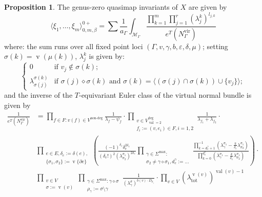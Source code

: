 \documentclass[11pt]{amsart}
\newcommand{\val}{\operatorname{val}}
\newcommand{\vv}{\operatorname{v}}
\theoremstyle{definition}
\newtheorem{prop}[thm]{Proposition}
\theoremstyle{definition}
\begin{document}
\begin{prop}

The genus-zero quasimap invariants of $X$ are given by
\begin{equation}
 \langle \xi_1,\ldots,\xi_m\rangle^{0+}_{0,m,\beta}=\sum \frac{1}{a_\Gamma}\int_{\mathcal M_\Gamma}\frac{\prod_{k=1}^m\prod_{j=1}^r(\lambda^k_j)^{l_{j,k}}}{e^T(N_\Gamma^\text{vir})}
\end{equation}
where: the sum runs over all fixed point loci $\left(\Gamma, v, \gamma, b,\varepsilon,\delta,\mu\right)$; setting $\sigma(k)=\vv(\mu(k))$, $\lambda^k_j$ is given by: 
\begin{equation*}
 \begin{cases}
  0 & \text{if } v_j\notin \sigma(k); \\
  \lambda^{\sigma(k)}_{\sigma(j)} & \text{if } \sigma(j)\diamond\sigma(k) \text{ and } \sigma(k)=\langle(\sigma(j)\cap\sigma(k))\cup\{v_j\}\rangle;
 \end{cases}
\end{equation*}
and the inverse of the $T$-equivariant Euler class of the virtual normal bundle is given by
\begin{equation}
 \begin{aligned}
  \frac{1}{e^T(N_\Gamma^{\text{vir}})}&=\prod_{f\in F\colon v(f)\in V^{\text{non-deg}}} \frac{1}{\lambda_f-\psi_f} \cdot \prod_{\substack{v\in V^\text{deg}_{\val=2}\\ f_i:=(v,e_i)\in F, i=1,2}} \frac{1}{\lambda_{f_1}+\lambda_{f_2}} \cdot \\
  &\prod_{\substack{e\in E, \delta_e:=\delta(e), \\ \{\sigma_1,\sigma_2\}:=\vv\{\partial e\}}}\left( \frac{(-1)^{\delta_e}\delta_e^{2\delta_e}}{(\delta_e!)^2(\lambda^{\sigma_1}_{\sigma_2})^{2\delta_e}}\prod_{\substack{\gamma\in\Sigma^{\text{max}}\colon \\ \sigma_2\neq\gamma\diamond\sigma_1,d^\gamma_e:=\ldots}}\frac{\prod_{k=d^\gamma_e+1}^{-1}(\lambda^{\sigma_1}_{\gamma}-\frac{k}{\delta_e}\lambda^{\sigma_1}_{\sigma_2})}{\prod_{k=0}^{d^\gamma_e}(\lambda^{\sigma_1}_{\gamma}-\frac{k}{\delta_e}\lambda^{\sigma_1}_{\sigma_2})} \right) \cdot \\
  & \prod_{\substack{v\in V \\ \sigma:=\vv(v)}} \prod_{\substack{\gamma\in\Sigma^{\text{max}}\colon\gamma\diamond\sigma \\ \rho_\gamma:=\sigma\setminus\gamma}}\frac{1}{(\lambda^{\sigma}_{\gamma})^{b(v)\cdot D_{\rho_\gamma}}}\cdot \prod_{v\in V}(\lambda^{\vv(v)}_{\text{tot}})^{\val(v)-1}
 \end{aligned}
\end{equation}
\end{prop}
\end{document}
